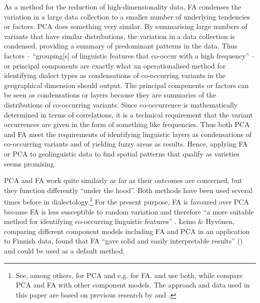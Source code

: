 \documentclass[output=paper]{LSP/langsci}
\begin{document}
As a method for the reduction of high-dimensionality data, FA condenses the variation in a large data collection to a smaller number of underlying tendencies or factors. PCA does something very similar. By summarising large numbers of variants that have similar distributions, the variation in a data collection is condensed, providing a summary of predominant patterns in the data. Thus factors – “grouping[s] of linguistic features that co-occur with a high frequency” – or principal components are exactly what an operationalised method for identifying dialect types as condensations of co-occurring variants in the geographical dimension should output. The principal components or factors can be seen as condensations or layers because they are summaries of the distributions of co-occurring variants. Since co-occurrence is mathematically determined in terms of correlations, it is a technical requirement that the variant occurrences are given in the form of something like frequencies. Thus both PCA and FA meet the requirements of identifying linguistic layers as condensations of co-occurring variants and of yielding fuzzy areas as results. Hence, applying FA or PCA to geolinguistic data to find spatial patterns that qualify as varieties seems promising.

PCA and FA work quite similarly as far as their outcomes are concerned, but they function differently ``under the hood''. Both methods have been used several times before in dialectology.\footnote{See, among others, \citet{shackleton_english-american_2005,hyvonen_multivariate_2007,szmrecsanyi_holistic_2011,wieling_analyzing_2013} for PCA and e.g. \citet{clopper_north_2006,nerbonne_identifying_2006,grieve_statistical_2011} for FA. \citet{grieve_corpus-based_2009} and \citet{leinonen_acoustic_2010} use both, while \citet{leino_comparison_2008} compare PCA and FA with other component models. The approach and data used in this paper are based on previous research by \citet{pickl_probabilistische_2013, pickl_verdichtungen_2013,buhler_dialektraume_2014,elmentaler_latente_2015} and \citet{proll_raumvariation_2015}.} For the present purpose, FA is favoured over PCA because FA is less susceptible to random variation and therefore “a more suitable method for identifying co-occurring linguistic features” \citep[106]{leinonen_acoustic_2010}. Leino \& Hyvönen, comparing different component models including FA and PCA in an application to Finnish data, found that FA “gave solid and easily interpretable results” (\citeyear[186]{leino_comparison_2008}) and could be used as a default method.
\end{document}
